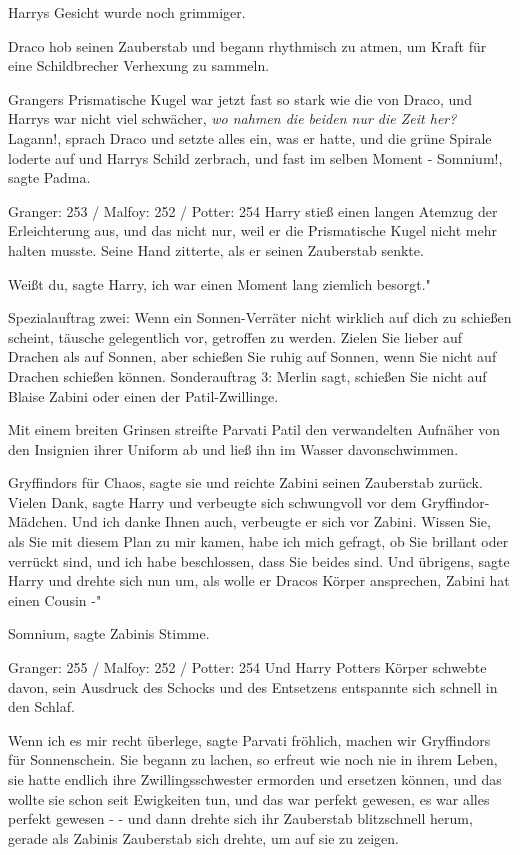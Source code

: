 Harrys Gesicht wurde noch grimmiger.

Draco hob seinen Zauberstab und begann rhythmisch zu atmen, um Kraft für eine
Schildbrecher Verhexung zu sammeln.

Grangers Prismatische Kugel war jetzt fast so stark wie die von Draco, und
Harrys war nicht viel schwächer, \emph{wo nahmen die beiden nur die Zeit her?}
\glqq Lagann!\grqq{}, sprach Draco und setzte alles ein, was er hatte, und die
grüne Spirale loderte auf und Harrys Schild zerbrach, und fast im selben Moment
- \glqq Somnium!\grqq{}, sagte Padma.

Granger: 253 / Malfoy: 252 / Potter: 254 Harry stieß einen langen Atemzug der
Erleichterung aus, und das nicht nur, weil er die Prismatische Kugel nicht mehr
halten musste. Seine Hand zitterte, als er seinen Zauberstab senkte.

\glqq Weißt du\grqq{}, sagte Harry, \glqq ich war einen Moment lang ziemlich
besorgt."

Spezialauftrag zwei: Wenn ein Sonnen-Verräter nicht wirklich auf dich zu
schießen scheint, täusche gelegentlich vor, getroffen zu werden. Zielen Sie
lieber auf Drachen als auf Sonnen, aber schießen Sie ruhig auf Sonnen, wenn Sie
nicht auf Drachen schießen können. Sonderauftrag 3: Merlin sagt, schießen Sie
nicht auf Blaise Zabini oder einen der Patil-Zwillinge.

Mit einem breiten Grinsen streifte Parvati Patil den verwandelten Aufnäher von
den Insignien ihrer Uniform ab und ließ ihn im Wasser davonschwimmen.

\glqq Gryffindors für Chaos\grqq{}, sagte sie und reichte Zabini seinen
Zauberstab zurück. \glqq Vielen Dank\grqq{}, sagte Harry und verbeugte sich
schwungvoll vor dem Gryffindor-Mädchen. \glqq Und ich danke Ihnen auch\grqq{},
verbeugte er sich vor Zabini. \glqq Wissen Sie, als Sie mit diesem Plan zu mir
kamen, habe ich mich gefragt, ob Sie brillant oder verrückt sind, und ich habe
beschlossen, dass Sie beides sind. Und übrigens\grqq{}, sagte Harry und drehte
sich nun um, als wolle er Dracos Körper ansprechen, \glqq Zabini hat einen
Cousin -"

\glqq Somnium\grqq{}, sagte Zabinis Stimme.

Granger: 255 / Malfoy: 252 / Potter: 254 Und Harry Potters Körper schwebte
davon, sein Ausdruck des Schocks und des Entsetzens entspannte sich schnell in
den Schlaf.

\glqq Wenn ich es mir recht überlege\grqq{}, sagte Parvati fröhlich, \glqq
machen wir Gryffindors für Sonnenschein.\grqq{} Sie begann zu lachen, so erfreut
wie noch nie in ihrem Leben, sie hatte endlich ihre Zwillingsschwester ermorden
und ersetzen können, und das wollte sie schon seit Ewigkeiten tun, und das war
perfekt gewesen, es war alles perfekt gewesen - - und dann drehte sich ihr
Zauberstab blitzschnell herum, gerade als Zabinis Zauberstab sich drehte, um auf
sie zu zeigen.

